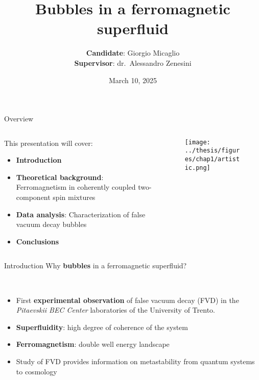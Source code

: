 \documentclass[aspectratio=169]{beamer}
\title[Bubbles in a ferromagnetic superfluid] %
{Bubbles in a ferromagnetic superfluid} %
\author{\textbf{Candidate}: Giorgio Micaglio\\\textbf{Supervisor}: dr.\ Alessandro Zenesini}
\institute{Bachelor's Degree in Physics}
\date[March 10, 2025]  %
{March 10, 2025} %
\begin{document}
\begin{frame}[plain]
  \titlepage
\end{frame}

\begin{frame}{Overview}
  \begin{columns}
      \begin{column}{0.7\textwidth}
          This presentation will cover:
          \begin{itemize}
              \item \textbf{Introduction}
              \item \textbf{Theoretical background}: Ferromagnetism in coherently coupled two-component spin mixtures
              \item \textbf{Data analysis}: Characterization of false vacuum decay bubbles
              \item \textbf{Conclusions}
          \end{itemize}
      \end{column}
      \begin{column}{0.3\textwidth}
          \begin{figure}
              \centering
              \texttt{[image: ../thesis/figures/chap1/artistic.png]}
          \end{figure}
      \end{column}
  \end{columns}
\end{frame}

\begin{frame}{Introduction}
  Why \textbf{bubbles} in a ferromagnetic superfluid?

  ~

  \begin{itemize}
      \item First \textbf{experimental observation} of false vacuum decay (FVD) in the \emph{Pitaevskii BEC Center} laboratories of the University of Trento.
      \item \textbf{Superfluidity}: high degree of coherence of the system
      \item \textbf{Ferromagnetism}: double well energy landscape
      \item Study of FVD provides information on metastability from quantum systems to cosmology
  \end{itemize}
  
\end{frame}
\end{document}
